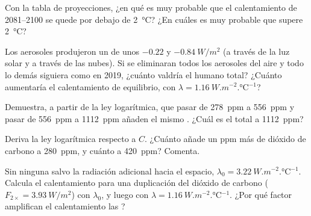 \begin{exercise}[$\star\star$]\label{exo:g12:climate-change:11}
Con la tabla de proyecciones, ¿en qué  es muy probable que el calentamiento de
2081--2100 se quede por debajo de \qty{2}{\degreeCelsius}? ¿En cuáles es
muy probable que supere \qty{2}{\degreeCelsius}?
\end{exercise}

\begin{exercise}[$\star\star\star$]\label{exo:g12:climate-change:12}
Los aerosoles produjeron un  de unos $-0.22$ y $\qty{-0.84}{W/m^2}$
(a través de la luz solar y a través de las nubes). Si se eliminaran todos los aerosoles del
aire y todo lo demás siguiera como en 2019, ¿cuánto valdría el 
humano total? ¿Cuánto aumentaría el calentamiento de equilibrio, con
$\lambda = \qty{1.16}{W.m^{-2}.\degreeCelsius^{-1}}$?
\end{exercise}

\begin{exercise}[$\star\star\star$]\label{exo:g12:climate-change:13}
Demuestra, a partir de la ley logarítmica, que pasar de \qty{278}{ppm} a
\qty{556}{ppm} y pasar de \qty{556}{ppm} a \qty{1112}{ppm} añaden el mismo
. ¿Cuál es el  total a \qty{1112}{ppm}?
\end{exercise}

\begin{exercise}[$\star\star\star$]\label{exo:g12:climate-change:14}
Deriva la ley logarítmica respecto a $C$. ¿Cuánto  añade
un ppm más de dióxido de carbono a \qty{280}{ppm}, y cuánto a
\qty{420}{ppm}? Comenta.
\end{exercise}

\begin{exercise}[$\star\star\star$]\label{exo:g12:climate-change:15}
Sin ninguna  salvo la radiación adicional hacia el espacio,
$\lambda_0 = \qty{3.22}{W.m^{-2}.\degreeCelsius^{-1}}$. Calcula el calentamiento
para una duplicación del dióxido de carbono ($F_{2\times} = \qty{3.93}{W/m^2}$) con
$\lambda_0$, y luego con $\lambda = \qty{1.16}{W.m^{-2}.\degreeCelsius^{-1}}$. ¿Por
qué factor amplifican el calentamiento las ?
\end{exercise}


